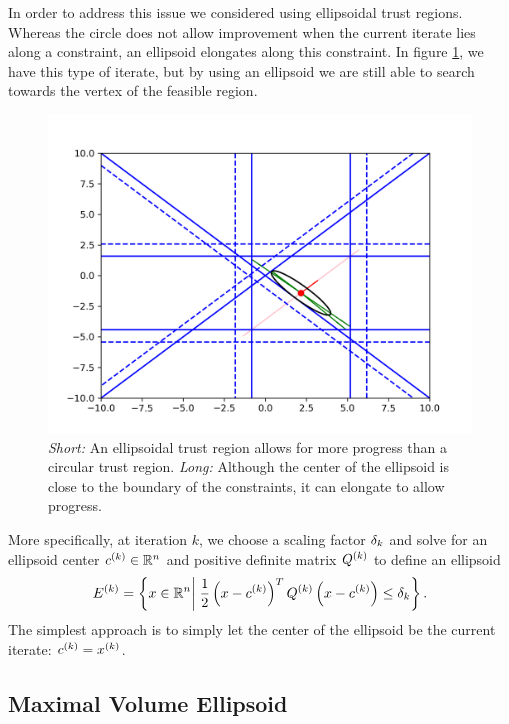 In order to address this issue we considered using ellipsoidal trust regions.
Whereas the circle does not allow improvement when the current iterate lies along a constraint, an ellipsoid elongates along this constraint.
In figure \cref{ellipse_adv}, we have this type of iterate, but by using an ellipsoid we are still able to search towards the vertex of the feasible region.
\begin{figure}[ht]
    \centering
    \includegraphics[scale=0.4]{images/advantage_of_ellipse_2.png}
    \caption{
    	\emph{Short:} An ellipsoidal trust region allows for more progress than a circular trust region.
    	\emph{Long:} Although the center of the ellipsoid is close to the boundary of the constraints, it can elongate to allow progress.
    }
    \label{ellipse_adv}
\end{figure}


More specifically, at iteration $k$, we choose a scaling factor ${\delta_k}$ and solve for an ellipsoid center ${c^{(k)}} \in \mathbb R^n$ and positive definite matrix ${Q^{(k)}}$ to define an ellipsoid
\begin{align*}
{E^{(k)}} = \left\{x \in \mathbb R^n \bigg| \; \frac 1 2 \left(x - {c^{(k)}}\right)^T{Q^{(k)}}\left(x - {c^{(k)}}\right) \le {\delta_k} \right\}.
\end{align*}
The simplest approach is to simply let the center of the ellipsoid be the current iterate: ${c^{(k)}} = x^{(k)}$.


\subsection{Maximal Volume Ellipsoid}

